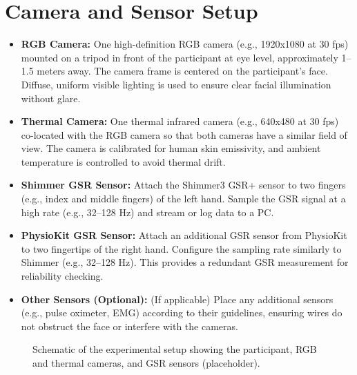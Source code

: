 \section{Camera and Sensor Setup}
\begin{itemize}
    \item \textbf{RGB Camera:} One high-definition RGB camera (e.g., 1920x1080 at 30 fps) mounted on a tripod in front of the participant at eye level, approximately 1–1.5 meters away. The camera frame is centered on the participant’s face. Diffuse, uniform visible lighting is used to ensure clear facial illumination without glare.
    \item \textbf{Thermal Camera:} One thermal infrared camera (e.g., 640x480 at 30 fps) co-located with the RGB camera so that both cameras have a similar field of view. The camera is calibrated for human skin emissivity, and ambient temperature is controlled to avoid thermal drift.
    \item \textbf{Shimmer GSR Sensor:} Attach the Shimmer3 GSR+ sensor to two fingers (e.g., index and middle fingers) of the left hand. Sample the GSR signal at a high rate (e.g., 32–128 Hz) and stream or log data to a PC.
    \item \textbf{PhysioKit GSR Sensor:} Attach an additional GSR sensor from PhysioKit to two fingertips of the right hand. Configure the sampling rate similarly to Shimmer (e.g., 32–128 Hz). This provides a redundant GSR measurement for reliability checking.
    \item \textbf{Other Sensors (Optional):} (If applicable) Place any additional sensors (e.g., pulse oximeter, EMG) according to their guidelines, ensuring wires do not obstruct the face or interfere with the cameras.
\end{itemize}

\begin{figure}[h]
    \centering
    \caption{Schematic of the experimental setup showing the participant, RGB and thermal cameras, and GSR sensors (placeholder).}
\end{figure}


